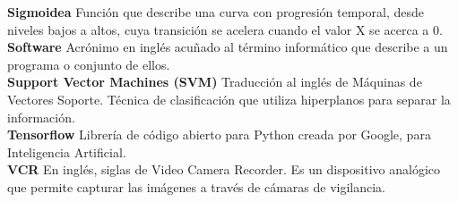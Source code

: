 \documentclass[a4paper,12pt,oneside,spanish]{book}
\begin{document}
\textbf{Sigmoidea} Función que describe una curva con progresión temporal, desde niveles bajos a altos, cuya transición se acelera cuando el valor X se acerca a 0.\\

\textbf{Software} Acrónimo en inglés acuñado al término informático que describe a un programa o conjunto de ellos.\\

\textbf{Support Vector Machines (SVM)} Traducción al inglés de Máquinas de Vectores Soporte. Técnica de clasificación que utiliza hiperplanos para separar la información.\\

\textbf{Tensorflow} Librería de código abierto para Python creada por Google, para Inteligencia Artificial.\\

\textbf{VCR} En inglés, siglas de Video Camera Recorder. Es un dispositivo analógico que permite capturar las imágenes a través de cámaras de vigilancia. \\
\end{document}

